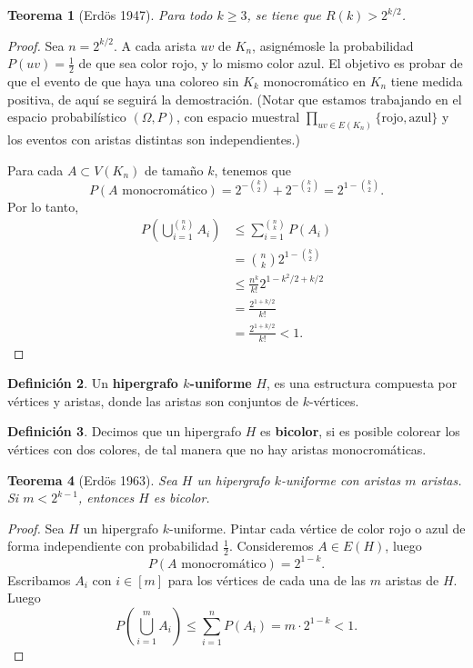 \documentclass[12pt]{report}
\theoremstyle{plain}
\newtheorem{theorem}{Teorema}[section]
\theoremstyle{definition}
\newtheorem{definition}[theorem]{Definición}
\begin{document}
\begin{theorem}[Erdös 1947]
Para todo $k \geq 3$, se tiene que $R(k) > 2^{k/2}$.
\end{theorem}
\begin{proof}
Sea $n = 2^{k/2}$. A cada arista $uv$ de $K_n$, asignémosle la probabilidad $P(uv) = \frac 1 2$ de que sea color rojo, y lo mismo color azul. El objetivo es probar de que el evento de que haya una coloreo sin $K_k$ monocromático en $K_n$ tiene medida positiva, de aquí se seguirá la demostración. (Notar que estamos trabajando en el espacio probabilístico $(\Omega, P)$, con espacio muestral $\prod_{uv \in E(K_n)} \{\text{rojo}, \text{azul}\}$ y los eventos con aristas distintas son independientes.)

Para cada $A \subset V(K_n)$ de tamaño $k$, tenemos que
\[
    P(A \text{ monocromático}) = 2^{-\binom k 2} + 2^{- \binom k 2} = 2^{1 - \binom k 2}.
\]
Por lo tanto,
\begin{align*}
P(\bigcup_{i = 1}^{\binom n k} A_i) &\leq \sum_{i = 1}^{\binom n k} P(A_i) \\
&= \binom n k    2^{1 - \binom k 2} \\
&\leq \frac{n^k}{k!} 2^{1 - k^2/2 + k/2} \\
&= \frac{2^{1 + k/2}}{k!} \\
&= \frac{2^{1+ k/2}}{k!} < 1.
\end{align*}
\end{proof}

\begin{definition}
Un \textbf{hipergrafo $k$-uniforme} $H$, es una estructura compuesta por vértices y aristas, donde las aristas son conjuntos de $k$-vértices.
\end{definition}



\begin{definition}
Decimos que un hipergrafo $H$ es \textbf{bicolor}, si es posible colorear los vértices con dos colores, de tal manera que no hay aristas monocromáticas.
\end{definition}


\begin{theorem}[Erdös 1963]
Sea $H$ un hipergrafo $k$-uniforme con aristas $m$ aristas. Si $m < 2^{k-1}$, entonces $H$ es bicolor.
\end{theorem}
\begin{proof}
Sea $H$ un hipergrafo $k$-uniforme. Pintar cada vértice de color rojo o azul de forma independiente con probabilidad $\frac 1 2$.
Consideremos $A \in E(H)$, luego
\[
    P(A \text{ monocromático}) = 2^{1-k}.
\]
Escribamos $A_i$ con $i \in [m]$ para los vértices de cada una de las $m$ aristas de $H$. Luego
\[
    P(\bigcup_{i = 1}^m A_i) \leq \sum_{i = 1}^n P(A_i) = m \cdot 2^{1-k} < 1.
\]
\end{proof}
\end{document}
